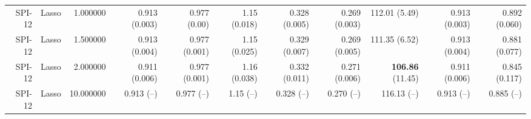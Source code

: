 \begin{table}
\begin{tabular}{rrrrrrrrrrr}
 SPI-12 &     Lasso &  1.000000 &        0.913 (0.003) &        0.977 (0.00) &        1.15 (0.018) &        0.328 (0.005) &        0.269 (0.003) &         112.01 (5.49) &        0.913 (0.003) &        0.892 (0.060) \\
 SPI-12 &     Lasso &  1.500000 &        0.913 (0.004) &       0.977 (0.001) &        1.15 (0.025) &        0.329 (0.007) &        0.269 (0.005) &         111.35 (6.52) &        0.913 (0.004) &        0.881 (0.077) \\
 SPI-12 &     Lasso &  2.000000 &        0.911 (0.006) &       0.977 (0.001) &        1.16 (0.038) &        0.332 (0.011) &        0.271 (0.006) & { \bf 106.86} (11.45) &        0.911 (0.006) &        0.845 (0.117) \\
 SPI-12 &     Lasso & 10.000000 &           0.913 (--) &          0.977 (--) &           1.15 (--) &           0.328 (--) &           0.270 (--) &           116.13 (--) &           0.913 (--) &           0.885 (--) \\
\bottomrule
\end{tabular}
\end{table}

